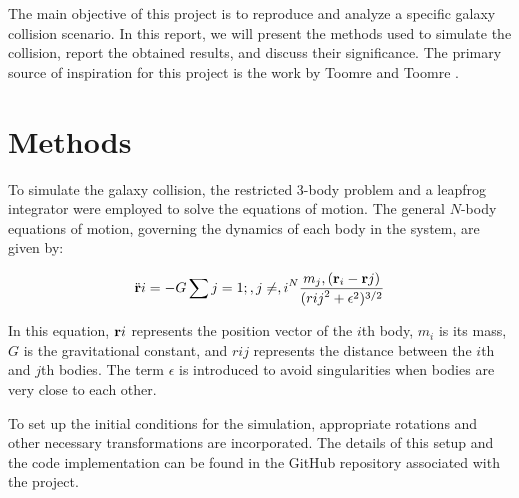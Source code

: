 \documentclass[reprint, amsmath, amssymb, aps]{revtex4-2}
\begin{document}
The main objective of this project is to reproduce and analyze a specific galaxy collision scenario. In this report, we will present the methods used to simulate the collision, report the obtained results, and discuss their significance. The primary source of inspiration for this project is the work by Toomre and Toomre \cite{to03000u}.

\section{Methods}
\label{sec:methods}

To simulate the galaxy collision, the restricted 3-body problem and a leapfrog integrator were employed to solve the equations of motion. The general $N$-body equations of motion, governing the dynamics of each body in the system, are given by:

\begin{equation}
    \ddot{{\bf r}}i = -G \sum{j=1;, j \not = ,i}^N \frac{{m_j , ({\bf r}_i - {\bf r}j)}}{{(r{ij}^2 + \epsilon^2)^{3/2}}}
    \label{eq:general_motion}
\end{equation}

In this equation, ${\bf r}i$ represents the position vector of the $i$th body, $m_i$ is its mass, $G$ is the gravitational constant, and $r{ij}$ represents the distance between the $i$th and $j$th bodies. The term $\epsilon$ is introduced to avoid singularities when bodies are very close to each other.

To set up the initial conditions for the simulation, appropriate rotations and other necessary transformations are incorporated. The details of this setup and the code implementation can be found in the GitHub repository associated with the project\cite{github}.
\end{document}

